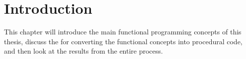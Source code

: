 \chapter{Introduction}
This chapter will introduce the main functional programming concepts of this thesis, discuss the \algorithm for converting the functional concepts into procedural code, and then look at the results from the entire process.




